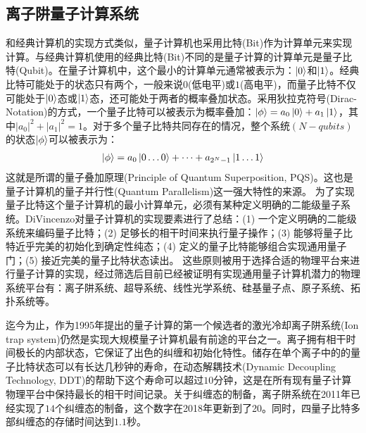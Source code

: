\subsection[离子阱量子计算系统]{离子阱量子计算系统}
和经典计算机的实现方式类似，量子计算机也采用比特(Bit)作为计算单元来实现计算。与经典计算机使用的经典比特(Bit)不同的是量子计算的计算单元是量子比特(Qubit)。在量子计算机中，这个最小的计算单元通常被表示为：$\ket{0}$和$\ket{1}$。经典比特可能处于的状态只有两个，一般来说$0$(低电平)或$1$(高电平)，而量子比特不仅可能处于$\ket{0}$态或$\ket{1}$态，还可能处于两者的概率叠加状态。采用狄拉克符号(Dirac-Notation)的方式，一个量子比特可以被表示为概率叠加：$\ket{\phi}=a_0\ket{0}+a_1\ket{1}$，其中$|a_0|^2+|a_1|^2=1$。对于多个量子比特共同存在的情况，整个系统$(N-qubits)$的状态$\ket{\phi}$可以被表示为：
\begin{align}
    \ket{\phi}=a_0\ket{0\dots0}+\dots+a_{2^N-1}\ket{1\dots1}
\end{align}
这就是所谓的量子叠加原理(Principle of Quantum Superposition, PQS)\cite[]{Fedorov_Manko_2019}。这也是量子计算机的量子并行性(Quantum Parallelism)这一强大特性的来源。
为了实现量子比特这个量子计算机的最小计算单元，必须有某种定义明确的二能级量子系统。DiVincenzo对量子计算机的实现要素进行了总结\cite[]{DiVincenzo_2000}：(1) 一个定义明确的二能级系统来编码量子比特；(2) 足够长的相干时间来执行量子操作；(3) 能够将量子比特近乎完美的初始化到确定性纯态；(4) 定义的量子比特能够组合实现通用量子门；(5) 接近完美的量子比特状态读出。
这些原则被用于选择合适的物理平台来进行量子计算的实现，经过筛选后目前已经被证明有实现通用量子计算机潜力的物理系统平台有：离子阱系统、超导系统、线性光学系统、硅基量子点、原子系统、拓扑系统等。

迄今为止，作为1995年提出的量子计算的第一个候选者的激光冷却离子阱系统(Ion trap system)仍然是实现大规模量子计算机最有前途的平台之一。离子拥有相干时间极长\cite[]{Fisk_Sellars_Lawn_Coles_1997}的内部状态，它保证了出色的纠缠和初始化特性\cite[]{Blatt_Wineland_2008}。储存在单个离子中的的量子比特状态可以有长达几秒钟的寿命\cite[]{Langer_Ozeri_Jost_Chiaverini_DeMarco_Ben_Kish_Blakestad_Britton_Hume_Itano_et_al_2005}，在动态解耦技术(Dynamic Decoupling Technology, DDT)的帮助下这个寿命可以超过$10$分钟\cite[]{Wang_Um_Zhang_An_Lyu_Zhang_Duan_Yum_Kim_2017}，这是在所有现有量子计算物理平台中保持最长的相干时间记录。关于纠缠态的制备，离子阱系统在2011年已经实现了$14$个纠缠态的制备\cite[]{Monz_Schindler_Barreiro_Chwalla_Nigg_Coish_Harlander_Hänsel_Hennrich_Blatt_2011}，这个数字在2018年更新到了20\cite[]{Friis_Marty_Maier_Hempel_Holzäpfel_Jurcevic_Plenio_Huber_Roos_Blatt_et_al_2018}。同时，四量子比特多部纠缠态的存储时间达到$1.1$秒\cite[]{Kaufmann_Ruster_Schmiegelow_Luda_Kaushal_Schulz_von_Lindenfels_Schmidt_Kaler_Poschinger_2017}。

